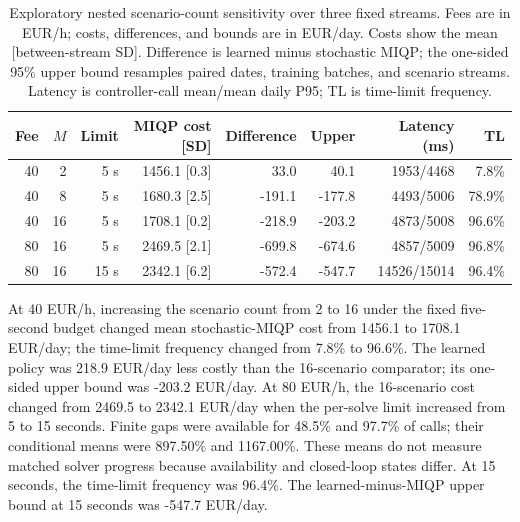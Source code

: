 \begin{table}[t]
\centering
\scriptsize
\caption{Exploratory nested scenario-count sensitivity over three fixed streams. Fees are in EUR/h; costs, differences, and bounds are in EUR/day. Costs show the mean [between-stream SD]. Difference is learned minus stochastic MIQP; the one-sided 95\% upper bound resamples paired dates, training batches, and scenario streams. Latency is controller-call mean/mean daily P95; TL is time-limit frequency.}
\label{tab:round2-scenarios}
\begin{tabular}{rrrrrrrr}
\toprule
Fee & $M$ & Limit & MIQP cost [SD] & Difference & Upper & Latency (ms) & TL \\
\midrule
40 & 2 & 5 s & 1456.1 [0.3] & 33.0 & 40.1 & 1953/4468 & 7.8\% \\
40 & 8 & 5 s & 1680.3 [2.5] & -191.1 & -177.8 & 4493/5006 & 78.9\% \\
40 & 16 & 5 s & 1708.1 [0.2] & -218.9 & -203.2 & 4873/5008 & 96.6\% \\
80 & 16 & 5 s & 2469.5 [2.1] & -699.8 & -674.6 & 4857/5009 & 96.8\% \\
80 & 16 & 15 s & 2342.1 [6.2] & -572.4 & -547.7 & 14526/15014 & 96.4\% \\
\bottomrule
\end{tabular}
\end{table}

At 40 EUR/h, increasing the scenario count from 2 to 16 under the fixed five-second budget changed mean stochastic-MIQP cost from 1456.1 to 1708.1 EUR/day; the time-limit frequency changed from 7.8\% to 96.6\%. The learned policy was 218.9 EUR/day less costly than the 16-scenario comparator; its one-sided upper bound was -203.2 EUR/day.
 At 80 EUR/h, the 16-scenario cost changed from 2469.5 to 2342.1 EUR/day when the per-solve limit increased from 5 to 15 seconds. Finite gaps were available for 48.5\% and 97.7\% of calls; their conditional means were 897.50\% and 1167.00\%. These means do not measure matched solver progress because availability and closed-loop states differ. At 15 seconds, the time-limit frequency was 96.4\%. The learned-minus-MIQP upper bound at 15 seconds was -547.7 EUR/day.
